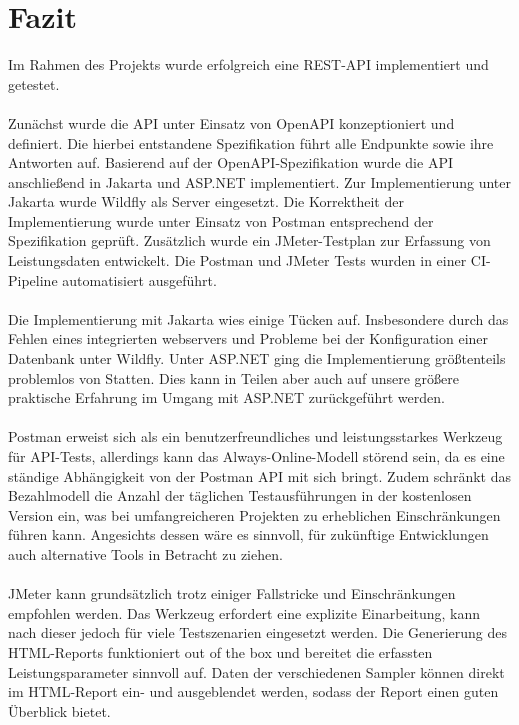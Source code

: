 \chapter{Fazit}

Im Rahmen des Projekts wurde erfolgreich eine REST-API implementiert und getestet.\\\\
Zunächst wurde die API unter Einsatz von OpenAPI konzeptioniert und definiert.
Die hierbei entstandene Spezifikation führt alle Endpunkte sowie ihre Antworten auf.
Basierend auf der OpenAPI-Spezifikation wurde die API anschließend in Jakarta und ASP.NET implementiert.
Zur Implementierung unter Jakarta wurde Wildfly als Server eingesetzt.
Die Korrektheit der Implementierung wurde unter Einsatz von Postman entsprechend der Spezifikation geprüft.
Zusätzlich wurde ein JMeter-Testplan zur Erfassung von Leistungsdaten entwickelt.
Die Postman und JMeter Tests wurden in einer CI-Pipeline automatisiert ausgeführt.\\\\
Die Implementierung mit Jakarta wies einige Tücken auf.
Insbesondere durch das Fehlen eines integrierten webservers
und Probleme bei der Konfiguration einer Datenbank unter Wildfly.
Unter ASP.NET ging die Implementierung größtenteils problemlos von Statten.
Dies kann in Teilen aber auch auf unsere größere praktische Erfahrung im Umgang mit ASP.NET zurückgeführt werden.\\\\
Postman erweist sich als ein benutzerfreundliches und leistungsstarkes Werkzeug für API-Tests,
allerdings kann das Always-Online-Modell störend sein, da es eine ständige Abhängigkeit von der Postman API mit sich bringt.
Zudem schränkt das Bezahlmodell die Anzahl der täglichen Testausführungen in der kostenlosen Version ein,
was bei umfangreicheren Projekten zu erheblichen Einschränkungen führen kann. 
Angesichts dessen wäre es sinnvoll, 
für zukünftige Entwicklungen auch alternative Tools in Betracht zu ziehen.\\\\
JMeter kann grundsätzlich trotz einiger Fallstricke und Einschränkungen empfohlen werden.
Das Werkzeug erfordert eine explizite Einarbeitung,
kann nach dieser jedoch für viele Testszenarien eingesetzt werden.
Die Generierung des HTML-Reports funktioniert out of the box
und bereitet die erfassten Leistungsparameter sinnvoll auf.
Daten der verschiedenen Sampler können direkt im HTML-Report ein- und ausgeblendet werden,
sodass der Report einen guten Überblick bietet.
